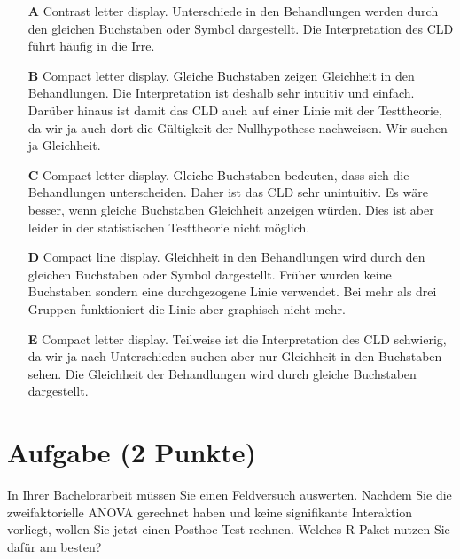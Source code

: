 \documentclass[a4paper, 9pt]{scrartcl}\usepackage[]{graphicx}\usepackage[]{xcolor}
\begin{document}
\begin{enumerate}
\item [\textbf{A} \msquare] Contrast letter display. Unterschiede in den Behandlungen werden durch den gleichen Buchstaben oder Symbol dargestellt. Die Interpretation des CLD führt häufig in die Irre.
\item [\textbf{B} \msquare] Compact letter display. Gleiche Buchstaben zeigen Gleichheit in den Behandlungen. Die Interpretation ist deshalb sehr intuitiv und einfach. Darüber hinaus ist damit das CLD auch auf einer Linie mit der Testtheorie, da wir ja auch dort die Gültigkeit der Nullhypothese nachweisen. Wir suchen ja Gleichheit.
\item [\textbf{C} \msquare] Compact letter display. Gleiche Buchstaben bedeuten, dass sich die Behandlungen unterscheiden. Daher ist das CLD sehr unintuitiv. Es wäre besser, wenn gleiche Buchstaben Gleichheit anzeigen würden. Dies ist aber leider in der statistischen Testtheorie nicht möglich.
\item [\textbf{D} \msquare] Compact line display. Gleichheit in den Behandlungen wird durch den gleichen Buchstaben oder Symbol dargestellt. Früher wurden keine Buchstaben sondern eine durchgezogene Linie verwendet. Bei mehr als drei Gruppen funktioniert die Linie aber graphisch nicht mehr.
\item [\textbf{E} \msquare] Compact letter display. Teilweise ist die Interpretation des CLD schwierig, da wir ja nach Unterschieden suchen aber nur Gleichheit in den Buchstaben sehen. Die Gleichheit der Behandlungen wird durch gleiche Buchstaben dargestellt.
\end{enumerate}

\section{Aufgabe \hfill (2 Punkte)}




In Ihrer Bachelorarbeit müssen Sie einen Feldversuch auswerten. Nachdem Sie die zweifaktorielle ANOVA gerechnet haben und keine signifikante Interaktion vorliegt, wollen Sie jetzt einen Posthoc-Test rechnen. Welches R Paket nutzen Sie dafür am besten?
\end{document}
